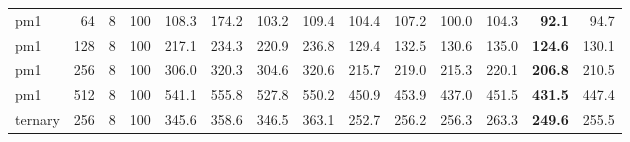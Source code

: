 \begin{tabular}{lrrrrrrrrrrrrr}
pm1 & 64 & 8 & 100 & 108.3 & 174.2 & 103.2 & 109.4 & 104.4 & 107.2 & 100.0 & 104.3 & \textbf{92.1} & 94.7 \\
pm1 & 128 & 8 & 100 & 217.1 & 234.3 & 220.9 & 236.8 & 129.4 & 132.5 & 130.6 & 135.0 & \textbf{124.6} & 130.1 \\
pm1 & 256 & 8 & 100 & 306.0 & 320.3 & 304.6 & 320.6 & 215.7 & 219.0 & 215.3 & 220.1 & \textbf{206.8} & 210.5 \\
pm1 & 512 & 8 & 100 & 541.1 & 555.8 & 527.8 & 550.2 & 450.9 & 453.9 & 437.0 & 451.5 & \textbf{431.5} & 447.4 \\
ternary & 256 & 8 & 100 & 345.6 & 358.6 & 346.5 & 363.1 & 252.7 & 256.2 & 256.3 & 263.3 & \textbf{249.6} & 255.5 \\
\bottomrule\end{tabular}
